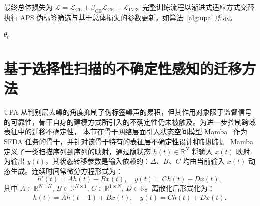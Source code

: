 最终总体损失为 $\mathcal{L} = \mathcal{L}_{\text{CL}} + \beta_{\text{CE}} \mathcal{L}_{\text{CE}} + \mathcal{L}_{\text{IM}}$。完整训练流程以渐进式适应方式交替执行 APS 伪标签筛选与基于总体损失的参数更新，如算法~\ref{alg:upa} 所示。

\begin{algorithm}[!htb]
  \label{alg:upa} 
  \small
  \BlankLine
  \Return $\theta_t$
\end{algorithm}


\section{基于选择性扫描的不确定性感知的迁移方法}

\label{sec:chap2_sfmamba}

UPA 从判别层去噪的角度抑制了伪标签噪声的累积，但其作用对象限于监督信号的可靠性，骨干自身的建模方式所引入的不确定性仍未被触及。为进一步控制跨域表征中的迁移不确定性，
本节在骨干网络层面引入状态空间模型 Mamba~\cite{gu2023mamba} 作为 SFDA 任务的骨干，并针对该骨干特有的表征层不确定性设计抑制机制。
Mamba定义了一类扫描序列到序列的映射，通过隐状态 $h(t) \in \mathbb{R}^N$ 将输入 $x(t)$ 映射为输出 $y(t)$，其状态转移参数是输入依赖的：$\Delta$、$B$、$C$ 均由当前输入 $x(t)$ 动态生成。连续时间常微分方程形式为：
\begin{equation}
h'(t) = A h(t) + B x(t), \quad y(t) = C h(t) + D x(t),
\label{eq:ssm_cont}
\end{equation}
其中 $A \in \mathbb{R}^{N \times N}$, $B \in \mathbb{R}^{N \times 1}$, $C \in \mathbb{R}^{1 \times N}$, $D \in \mathbb{R}$。离散化后形式化为：
\begin{equation}
h(t) = \overline{A} h(t-1) + \overline{B} x(t), \quad y(t) = C h(t) + D x(t).
\label{eq:ssm_disc}
\end{equation}


